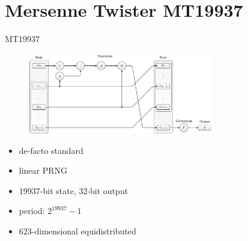 \documentclass[aspectratio=169]{beamer}
\begin{document}
    \section{Mersenne Twister MT19937}
    \begin{frame}{MT19937}
      \begin{figure}
        \includegraphics[width=0.72\textwidth]{figures/mt19937_scheme.pdf}
      \end{figure}
      \bigskip
      \begin{minipage}{0.49\textwidth}
        \begin{itemize}
          \pause
          \item de-facto standard
          \pause
          \item linear PRNG
          \pause
          \item 19937-bit state, 32-bit output
        \end{itemize}
      \end{minipage}
      \hfill
      \begin{minipage}{0.4\textwidth}
        \begin{itemize}
          \pause
          \item period: $2^{19937}-1$
          \pause
          \item 623-dimensional equidistributed
        \end{itemize}
      \end{minipage}
    \end{frame}
\end{document}
